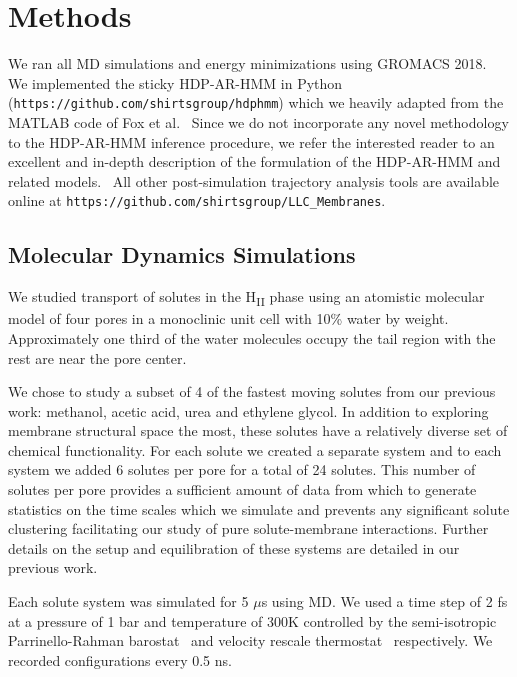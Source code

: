 \documentclass[journal=jpcbfk,manuscript=article]{achemso}
\begin{document}
  \section{Methods}
    
  We ran all MD simulations and energy minimizations using GROMACS 2018.~\cite{bekker_gromacs:_1993,berendsen_gromacs:_1995,van_der_spoel_gromacs:_2005,hess_gromacs_2008}  
  We implemented the sticky HDP-AR-HMM in Python 
  (\texttt{https://github.com/shirtsgroup/hdphmm}) which we heavily adapted from
  the MATLAB code of Fox et al.~\cite{fox_nonparametric_2009} Since we do not incorporate
  any novel methodology to the HDP-AR-HMM inference procedure, we refer the 
  interested reader to an excellent and in-depth description of the formulation of
  the HDP-AR-HMM and related models.~\cite{fox_bayesian_2010} 
  All other post-simulation trajectory analysis tools are available online at
  \texttt{https://github.com/shirtsgroup/LLC\_Membranes}.

  \subsection{Molecular Dynamics Simulations}

  We studied transport of solutes in the H\textsubscript{II} phase using an
  atomistic molecular model of four pores in a monoclinic unit cell with 
  10\% water by weight. Approximately one third of the water molecules 
  occupy the tail region with the rest are near the pore center.~\cite{coscia_chemically_2019}

  We chose to study a subset of 4 of the fastest moving solutes from our previous
  work: methanol, acetic acid, urea and ethylene glycol. In addition to exploring 
  membrane structural space the most, these solutes have a relatively diverse set
  of chemical functionality. For each solute we created a separate system and to 
  each system we added 6 solutes per pore for a total of 24 solutes. This number 
  of solutes per pore provides a sufficient amount of data from which to generate 
  statistics on the time scales which we simulate and prevents any significant
  solute clustering facilitating our study of pure solute-membrane interactions. 
  Further details on the setup and equilibration of these systems are detailed 
  in our previous work.~\cite{coscia_chemically_2019}
  
  Each solute system was simulated for 5 $\mu$s using MD. We used a time step of 2 
  fs at a pressure of 1 bar and temperature of 300K controlled by the semi-isotropic 
  Parrinello-Rahman barostat~\cite{parrinello_polymorphic_1981} and velocity rescale 
  thermostat~\cite{bussi_canonical_2007} respectively. We recorded configurations every 0.5 ns.
\end{document}
